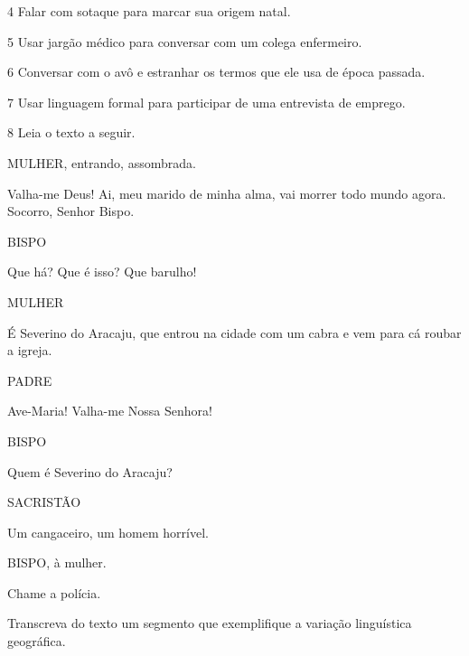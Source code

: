 \num{4} Falar com sotaque para marcar sua origem natal.


\num{5} Usar jargão médico para conversar com um colega enfermeiro.


\num{6} Conversar com o avô e estranhar os termos que ele usa de época passada.


\num{7}  Usar linguagem formal para participar de uma entrevista de emprego.


\num{8} Leia o texto a seguir.

\begin{myquote}

MULHER, entrando, assombrada.

Valha-me Deus! Ai, meu marido de minha alma, vai morrer todo mundo agora. Socorro, Senhor Bispo.

BISPO

Que há? Que é isso? Que barulho!

MULHER

É Severino do Aracaju, que entrou na cidade com um cabra e vem para cá roubar a igreja.

PADRE

Ave-Maria! Valha-me Nossa Senhora!

BISPO

Quem é Severino do Aracaju?

SACRISTÃO

Um cangaceiro, um homem horrível.

BISPO, à mulher.

Chame a polícia.
\end{myquote}


Transcreva do texto um segmento que exemplifique a variação linguística geográfica.



